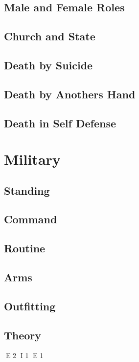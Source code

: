 \subsection{Male and Female Roles}
\subsection{Church and State}
\subsection{Death by Suicide}
\subsection{Death by Anothers Hand}
\subsection{Death in Self Defense}

\section{Military}
\subsection{Standing}
\subsection{Command}
\subsection{Routine}
\subsection{Arms}
\subsection{Outfitting}
\subsection{Theory}

E 2
I 1
E 1

